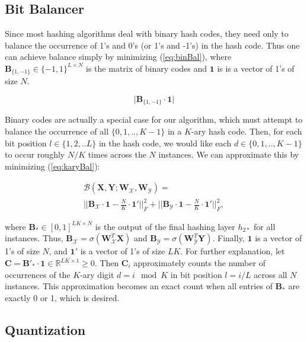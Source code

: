 \documentclass[letterpaper]{article}
\newcommand{\bpx}{\mathbf{B_\mathcal{X}}}
\newcommand{\bpy}{\mathbf{B_\mathcal{Y}}}
\newcommand{\bps}{\mathbf{B_*}}
\newcommand{\WX}{\mathbf{W}_\mathcal{X}}
\newcommand{\WY}{\mathbf{W}_\mathcal{Y}}
\newcommand{\X}{\mathbf{X}}
\newcommand{\Y}{\mathbf{Y}}
\begin{document}
\subsection{Bit Balancer}

Since most hashing algorithms deal with binary hash codes, they need only to balance the occurrence of 1's and 0's (or 1's and -1's) in the hash code. Thus one can achieve balance simply by minimizing (\ref{eq:binBal}), where $ \mathbf{B}_{\{1,-1\}} \in \{-1,1\}^{L \times N} $ is the matrix of binary codes and $ \mathbf{1} $ is is a vector of 1's of size $ N $.

\begin{equation}
\label{eq:binBal}
\big| \mathbf{B}_{\{1,-1\}} \cdot \mathbf{1} \big|
\end{equation}

Binary codes are actually a special case for our algorithm, which must attempt to balance the occurrence of all $ \{0,1,.., K-1\} $ in a $K$-ary hash code. Then, for each bit position $ l \in \{1,2,..L\} $ in the hash code, we would like each $ d \in \{0,1,.., K-1\} $ to occur roughly $ N / K $ times across the $ N $ instances. We can approximate this by minimizing (\ref{eq:karyBal}): 

\begin{equation}
\label{eq:karyBal}
\begin{gathered}
\mathcal{B}(\X,\Y; \WX, \WY) = \\
\Big|\Big| \bpx \cdot \mathbf{1} - \frac{N}{K} \cdot \mathbf{1'} \Big|\Big|_F^2 + \Big|\Big| \bpy \cdot \mathbf{1} - \frac{N}{K} \cdot \mathbf{1'} \Big|\Big|_F^2,
\end{gathered}
\end{equation}

\noindent where $ \bps \in [0,1]^{LK \times N} $ is the output of the final hashing layer $ h_{2*} $ for all instances. Thus, $ \bpx = \sigma(\WX^T\X) $ and $ \bpy = \sigma(\WY^T\Y) $. Finally, $ \mathbf{1} $ is a vector of 1's of size $ N $, and $ \mathbf{1}' $ is a vector of 1's of size $ LK $. For further explanation, let $ \mathbf{C} = \mathbf{B'_\mathcal{*}} \cdot \mathbf{1} \in \mathbb{R}^{LK \times 1} \geq 0 $. Then $ \mathbf{C}_i $ approximately counts the number of occurrences of the $K$-ary digit $ d = i \mod K $ in bit position $ l = i / L $ across all $ N $ instances. This approximation becomes an exact count when all entries of $ \bps $ are exactly 0 or 1, which is desired.

\subsection{Quantization}
\end{document}
